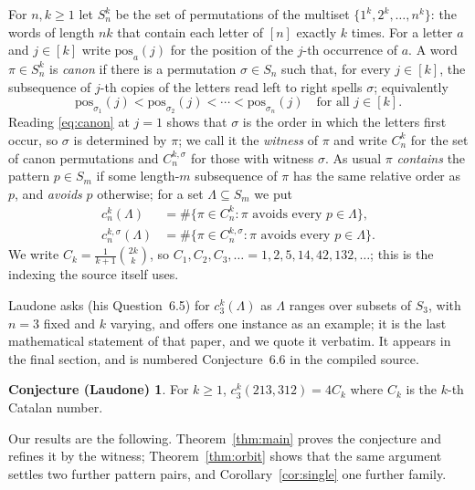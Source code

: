 \documentclass[11pt]{amsart}
\theoremstyle{definition}
\newtheorem*{conjecture*}{Conjecture (Laudone)}
\newcommand{\Cat}{C}
\begin{document}
For $n,k\ge1$ let $S_n^k$ be the set of permutations of the multiset
$\{1^k,2^k,\dots,n^k\}$: the words of length $nk$ that contain each letter
of $[n]$ exactly $k$ times. For a letter $a$ and $j\in[k]$ write
$\mathrm{pos}_a(j)$ for the position of the $j$-th occurrence of $a$. A word
$\pi\in S_n^k$ is \emph{canon} if there is a permutation $\sigma\in S_n$
such that, for every $j\in[k]$, the subsequence of $j$-th copies of the
letters read left to right spells $\sigma$; equivalently
\begin{equation}\label{eq:canon}
\mathrm{pos}_{\sigma_1}(j)<\mathrm{pos}_{\sigma_2}(j)<\cdots
<\mathrm{pos}_{\sigma_n}(j)
\quad\text{for all }j\in[k].
\end{equation}
Reading \eqref{eq:canon} at $j=1$ shows that $\sigma$ is the order in which the
letters first occur, so $\sigma$ is determined by $\pi$; we call it the
\emph{witness} of $\pi$ and write $C_n^k$ for the set of canon permutations and
$C_n^{k,\sigma}$ for those with witness $\sigma$. As usual $\pi$
\emph{contains} the pattern $p\in S_m$ if some length-$m$ subsequence of $\pi$
has the same relative order as $p$, and \emph{avoids} $p$ otherwise; for a set
$\Lambda\subseteq S_m$ we put
\begin{align*}
c_n^k(\Lambda)&=\#\{\pi\in C_n^k:\pi\text{ avoids every }p\in\Lambda\},\\
c_n^{k,\sigma}(\Lambda)&=\#\{\pi\in C_n^{k,\sigma}:
   \pi\text{ avoids every }p\in\Lambda\}.
\end{align*}
We write $\Cat_k=\frac{1}{k+1}\binom{2k}{k}$, so
$\Cat_1,\Cat_2,\Cat_3,\dots=1,2,5,14,42,132,\dots$; this is the indexing the
source itself uses.

Laudone \cite{Laudone} asks (his Question~6.5) for $c_3^k(\Lambda)$ as
$\Lambda$ ranges over subsets of $S_3$, with $n=3$ fixed and $k$ varying, and
offers one instance as an example; it is the last mathematical statement of
that paper, and we quote it verbatim. It appears in the final section, and is
numbered Conjecture~6.6 in the compiled source.

\begin{conjecture*}
For $k\ge1$, $c_3^k(213,312)=4C_k$ where $C_k$ is the $k$-th Catalan number.
\end{conjecture*}

Our results are the following. Theorem~\ref{thm:main} proves the conjecture
and refines it by the witness; Theorem~\ref{thm:orbit} shows that the same
argument settles two further pattern pairs, and Corollary~\ref{cor:single} one
further family.
\end{document}
